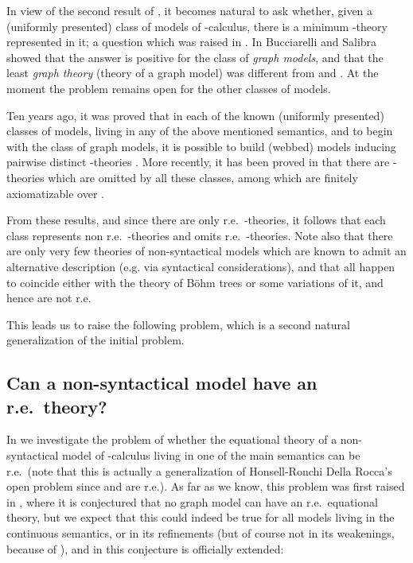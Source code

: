 \documentclass[english]{llncs}
\begin{document}
In view of the second result of \cite{DiGianantonioHP95}, it becomes natural to ask whether, given a (uniformly presented) class of models of -calculus, 
there is a minimum -theory represented in it; a question which was raised in \cite{Berline00}. 
In \cite{BucciarelliS04,BucciarelliS0X} Bucciarelli and Salibra showed that the answer is positive for the class of \emph{graph models}, and that 
the least \emph{graph theory} (theory of a graph model) was different from  and .
At the moment the problem remains open for the other classes of models.

Ten years ago, it was proved that in each of the known (uniformly presented) classes of models, living in any of the above mentioned semantics, 
and to begin with the class of graph models, it is possible to build  (webbed) models inducing pairwise distinct -theories 
\cite{Kerth98b,Kerth01}. 
More recently, it has been proved in \cite{Salibra03} that there are  -theories which are omitted by all these classes, among which 
 are finitely axiomatizable over .

From these results, and since there are only  r.e.\ -theories, it follows that each class represents  non r.e.\ 
-theories and omits  r.e.\ -theories. 
Note also that there are only very few theories of non-syntactical models which are known to admit an alternative description 
(e.g. via syntactical considerations), and that all happen to coincide either with the theory  of B\"{o}hm trees \cite[Sec.~16.4]{Bare} 
or some variations of it, and hence are not r.e. 

This leads us to raise the following problem, which is a second natural generalization of the initial problem.

\subsection{Can a non-syntactical model have an r.e.\ theory?} 

In \cite[Chapter~6]{ManzonettoTh} we investigate the problem of whether the equational theory of a non-syntactical model of -calculus living in one of the main semantics can be r.e.\ 
(note that this is actually a generalization of Honsell-Ronchi Della Rocca's open problem since  and  are r.e.).
As far as we know, this problem was first raised in \cite{Berline06}, where it is conjectured that no graph model can have an r.e.\ equational theory,
but we expect that this could indeed be true for all models living in the continuous semantics, or in its refinements 
(but of course not in its weakenings, because of \cite{DiGianantonioHP95}), and in \cite{ManzonettoTh} this conjecture is officially extended:
\end{document}
